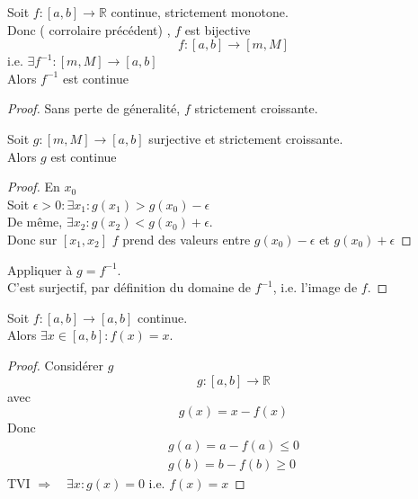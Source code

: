 \documentclass[../main.tex]{subfiles}
\begin{document}
\begin{propo}
	Soit $f: [ a,b] \to \mathbb{R}$ continue, strictement monotone.\\
	Donc ( corrolaire précédent) , $f$ est bijective 
	\[ 
	f: [ a,b]  \to [ m,M] 
	\]
	i.e. $\exists f^{-1}: [ m,M] \to [ a,b] $ \\
	Alors $f^{-1}$ est continue
\end{propo}
\begin{proof}
Sans perte de géneralité, $f$ strictement croissante.\\
\begin{lemma}
Soit $g: [ m,M] \to [ a,b] $ surjective et strictement croissante.\\
Alors $g$ est continue
\end{lemma}
\begin{proof}
En $x_0$ \\
Soit $\epsilon> 0: \exists x_1: g( x_1) > g( x_0) - \epsilon$ \\
De même, $\exists x_2: g( x_2) < g( x_0)  + \epsilon$.\\
Donc sur $[x_1, x_2]$ $f$ prend des valeurs entre $g( x_0) -\epsilon$ et $g( x_0) + \epsilon$
\end{proof}
Appliquer à $g= f^{-1}$.\\
C'est surjectif, par définition du domaine de $f^{-1}$, i.e. l'image de $f$.

\end{proof}
\begin{crly}
Soit $f: [ a,b] \to [ a,b] $ continue.\\
Alors $\exists x \in [ a,b] : f( x) = x$.
\end{crly}
\begin{proof}
Considérer $g$ 
\[ 
g: [ a,b]  \to \mathbb{R}
\]
avec 
\[ 
	g( x) = x-f( x) 
\]
Donc 
\begin{align*}
g( a)  = a- f( a) \leq 0\\
g( b)  = b - f( b) \geq 0
\end{align*}
TVI $\Rightarrow \quad \exists x: g( x) = 0$ i.e. $f( x) = x$
\end{proof}
\end{document}
